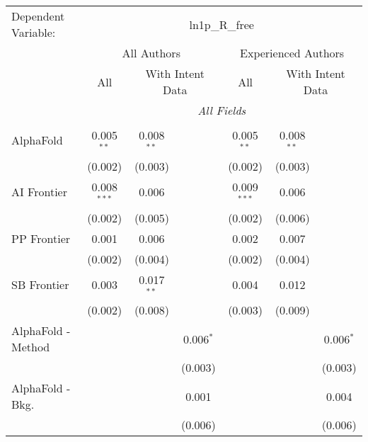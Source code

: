 \begingroup
\centering
\begin{tabular}{lcccccc}
   \tabularnewline \midrule \midrule
   Dependent Variable: & \multicolumn{6}{c}{ln1p\_R\_free}\\
 & \multicolumn{3}{c}{All Authors} & \multicolumn{3}{c}{Experienced Authors} \\
\cmidrule(lr){2-4} \cmidrule(lr){5-7}
 & \multicolumn{1}{c}{All} & \multicolumn{2}{c}{With Intent Data} & \multicolumn{1}{c}{All} & \multicolumn{2}{c}{With Intent Data} \\
\cmidrule(lr){2-2} \cmidrule(lr){3-4} \cmidrule(lr){5-5} \cmidrule(lr){6-7}
 & \multicolumn{6}{c}{\textit{All Fields}} \\ \\
   AlphaFold                     & 0.005$^{**}$  & 0.008$^{**}$ &                & 0.005$^{**}$  & 0.008$^{**}$ &   \\   
                                 & (0.002)       & (0.003)      &                & (0.002)       & (0.003)      &   \\   
   AI Frontier                   & 0.008$^{***}$ & 0.006        &                & 0.009$^{***}$ & 0.006        &   \\   
                                 & (0.002)       & (0.005)      &                & (0.002)       & (0.006)      &   \\   
   PP Frontier                   & 0.001         & 0.006        &                & 0.002         & 0.007        &   \\   
                                 & (0.002)       & (0.004)      &                & (0.002)       & (0.004)      &   \\   
   SB Frontier                   & 0.003         & 0.017$^{**}$ &                & 0.004         & 0.012        &   \\   
                                 & (0.002)       & (0.008)      &                & (0.003)       & (0.009)      &   \\   
   AlphaFold - Method            &               &              & 0.006$^{*}$    &               &              & 0.006$^{*}$\\   
                                 &               &              & (0.003)        &               &              & (0.003)\\   
   AlphaFold - Bkg.              &               &              & 0.001          &               &              & 0.004\\   
                                 &               &              & (0.006)        &               &              & (0.006)\\   

\end{tabular}
